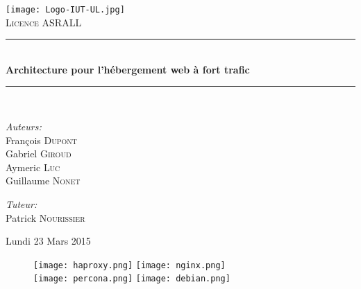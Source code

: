\begin{titlepage}
\begin{center}
 \newcommand{\HRule}{\rule{\linewidth}{0.5mm}}

\texttt{[image: Logo-IUT-UL.jpg]}\\[1cm]


\textsc{\LARGE Licence ASRALL}\\[0.5cm]

\HRule \\[0.4cm]
{ \huge \bfseries Architecture pour l'hébergement web à fort trafic \\[0.4cm] }

\HRule \\[1.5cm]

\noindent
\begin{minipage}{0.5\textwidth}
\begin{flushleft} \large
\emph{Auteurs:}\\
François \textsc{Dupont}\\
Gabriel \textsc{Giroud}\\
Aymeric \textsc{Luc}\\
Guillaume \textsc{Nonet}
\end{flushleft}
\end{minipage}%
\begin{minipage}{0.5\textwidth}
\begin{flushright} \large
\emph{Tuteur:} \\
Patrick \textsc{Nourissier}
\end{flushright}
\end{minipage}

\vfill

{\Large Lundi 23 Mars 2015}
\\[1cm]

\vfill

\begin{figure}[h]
    \centering
    \texttt{[image: haproxy.png]}
    \hfill
    \texttt{[image: nginx.png]}
    \\[0.2cm]
    \texttt{[image: percona.png]}
    \hfill
    \texttt{[image: debian.png]}
\end{figure}


\end{center}
\end{titlepage}
